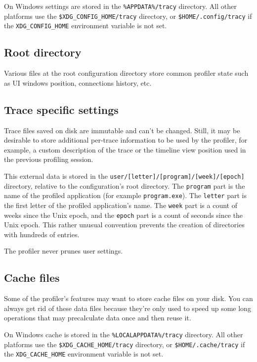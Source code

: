 \documentclass[hidelinks,titlepage,a4paper,twoside]{article}
\begin{document}
On Windows settings are stored in the \texttt{\%APPDATA\%/tracy} directory. All other platforms use the \texttt{\$XDG\_CONFIG\_HOME/tracy} directory, or \texttt{\$HOME/.config/tracy} if the \texttt{XDG\_CONFIG\_HOME} environment variable is not set.

\subsection{Root directory}

Various files at the root configuration directory store common profiler state such as UI windows position, connections history, etc.

\subsection{Trace specific settings}
\label{tracespecific}

Trace files saved on disk are immutable and can't be changed. Still, it may be desirable to store additional per-trace information to be used by the profiler, for example, a custom description of the trace or the timeline view position used in the previous profiling session.

This external data is stored in the \texttt{user/[letter]/[program]/[week]/[epoch]} directory, relative to the configuration's root directory. The \texttt{program} part is the name of the profiled application (for example \texttt{program.exe}). The \texttt{letter} part is the first letter of the profiled application's name. The \texttt{week} part is a count of weeks since the Unix epoch, and the \texttt{epoch} part is a count of seconds since the Unix epoch. This rather unusual convention prevents the creation of directories with hundreds of entries.

The profiler never prunes user settings.

\subsection{Cache files}

Some of the profiler's features may want to store cache files on your disk. You can always get rid of these data files because they're only used to speed up some long operations that may precalculate data once and then reuse it.

On Windows cache is stored in the \texttt{\%LOCALAPPDATA\%/tracy} directory. All other platforms use the \texttt{\$XDG\_CACHE\_HOME/tracy} directory, or \texttt{\$HOME/.cache/tracy} if the \texttt{XDG\_CACHE\_HOME} environment variable is not set.
\end{document}
